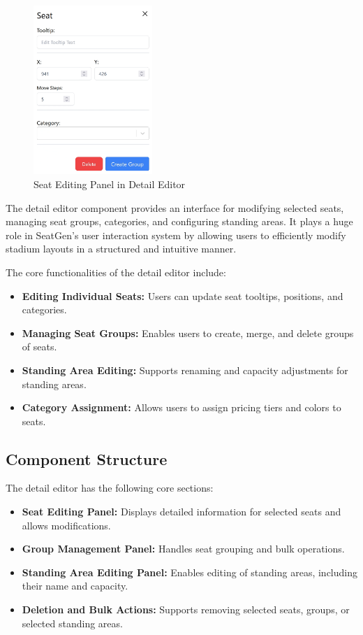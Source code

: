 \begin{figure}
    \begin{center}
    \includegraphics[width=0.4\textwidth]{pics/DetailEditorSeat.png}
    \caption{Seat Editing Panel in Detail Editor}
    \label{fig:detail-editor-seat}
    \end{center}
\end{figure}

The detail editor component provides an interface for modifying selected seats, managing seat groups, categories, and configuring standing areas. It plays a huge role in SeatGen’s user interaction system by allowing users to efficiently modify stadium layouts in a structured and intuitive manner.

The core functionalities of the detail editor include:
\begin{itemize}
    \item \textbf{Editing Individual Seats:} Users can update seat tooltips, positions, and categories.
    \item \textbf{Managing Seat Groups:} Enables users to create, merge, and delete groups of seats.
    \item \textbf{Standing Area Editing:} Supports renaming and capacity adjustments for standing areas.
    \item \textbf{Category Assignment:} Allows users to assign pricing tiers and colors to seats.
\end{itemize}

\subsection{Component Structure}
The detail editor has the following core sections:

\begin{itemize}
    \item \textbf{Seat Editing Panel:} Displays detailed information for selected seats and allows modifications.
    \item \textbf{Group Management Panel:} Handles seat grouping and bulk operations.
    \item \textbf{Standing Area Editing Panel:} Enables editing of standing areas, including their name and capacity.
    \item \textbf{Deletion and Bulk Actions:} Supports removing selected seats, groups, or selected standing areas.
\end{itemize}


